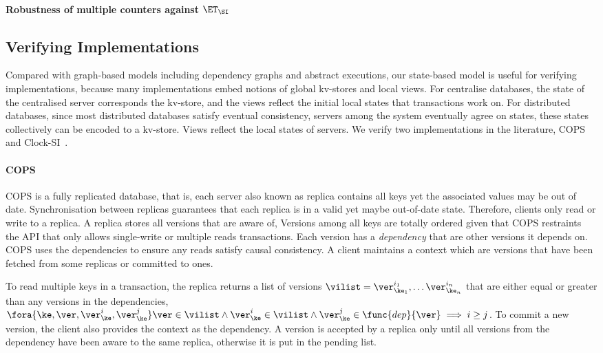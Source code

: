 \paragraph{Robustness of multiple counters against $\ET_{\SI}$}

\subsection{Verifying Implementations}
\label{sec:verify-impl}
Compared with graph-based models including dependency graphs and abstract executions,
our state-based model is useful for verifying implementations,
because many implementations embed notions of global kv-stores and local views.
For centralise databases, the state of the centralised server corresponds the kv-store,
and the views reflect the initial local states that transactions work on.
For distributed databases, since most distributed databases satisfy eventual consistency, 
\ie servers among the system eventually agree on states,
these states collectively can be encoded to a kv-store.
Views reflect the local states of servers.
We verify two implementations in the literature, 
COPS~\cite{Lloyd:2011:DSE:2043556.2043593} and Clock-SI~\cite{Du:2013:CSI:2553409.2553434}.

\paragraph{\bf COPS}
COPS is a fully replicated database, that is, 
each server also known as replica contains all keys yet the associated values may be out of date.
Synchronisation between replicas guarantees that each replica is in a valid yet maybe out-of-date state.
Therefore, clients only read or write to a replica.
A replica stores all versions that are aware of,
Versions among all keys are totally ordered given that
COPS restraints the API that only allows single-write or multiple reads transactions.
Each version has a \emph{dependency} that are other versions it depends on.
COPS uses the dependencies to ensure any reads satisfy causal consistency.
A client maintains a context which are versions 
that have been fetched from some replicas or committed to ones.

To read multiple keys in a transaction, the replica returns a list of versions \( \vilist = \ver^{i_1}_{\ke_1}, \dots \ver^{i_n}_{\ke_n} \) 
that are either equal or greater than any versions in the dependencies,
\ie \( \fora{\ke, \ver, \ver^{i}_{\ke}, \ver^{j}_{\ke}} \ver \in \vilist \land \ver^{i}_{\ke} \in \vilist \land \ver^{j}_{\ke} \in \func{dep}{\ver} \implies i \geq j \).
To commit a new version, the client also provides the context as the dependency.
A version is accepted by a replica
only until all versions from the dependency have been aware to the same replica,
otherwise it is put in the pending list.

